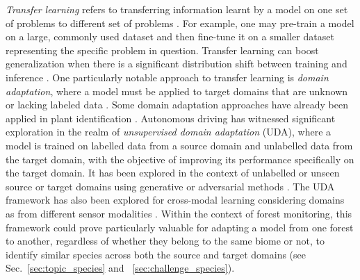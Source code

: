 \documentclass{CUP-JNL-DTM}%
\theoremstyle{definition}
\numberwithin{equation}{section}
\begin{document}
\emph{Transfer learning} refers to transferring information learnt by a model on one set of problems to different set of problems \cite{weiss_survey_2016}. For example, one may pre-train a model on a large, commonly used dataset and then fine-tune it on a smaller dataset representing the specific problem in question.
Transfer learning can boost generalization when there is a significant distribution shift between training and inference \cite{csurka_domain_2017}. 
%
One particularly notable approach to transfer learning is \emph{domain adaptation}, where a model must be applied to target domains that are unknown or lacking labeled data \citep{soltani_transfer_2022}. Some domain adaptation approaches have already been applied in plant identification \cite{ganin_unsupervised_2015}.
%
%
Autonomous driving has witnessed significant exploration in the realm of \emph{unsupervised domain adaptation} (UDA), where a model is trained on labelled data from a source domain and unlabelled data from the target domain, with the objective of improving its performance specifically on the target domain.
It has been explored in the context of unlabelled or unseen source or target domains \cite{wilson_survey_2020} using generative \cite{hoffman_cycada_2018} or adversarial methods \cite{vu_advent_2019}. The UDA framework has also been explored for cross-modal learning considering domains as from different sensor modalities \cite{jaritz_xmuda_2020}.
Within the context of forest monitoring, this framework could prove particularly valuable for adapting a model from one forest to another, regardless of whether they belong to the same biome or not, to identify similar species across both the source and target domains (see Sec.~\ref{sec:topic_species} and ~\ref{sec:challenge_species}).
\end{document}
